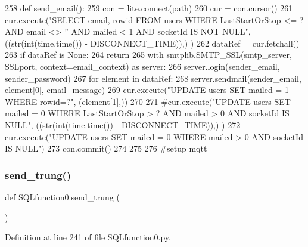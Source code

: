 \begin{DoxyCode}
258 \textcolor{keyword}{def }send_email():
259     con = lite.connect(path)
260     cur = con.cursor()
261     cur.execute(\textcolor{stringliteral}{"SELECT email, rowid FROM users WHERE LastStartOrStop <= ? AND email <> '' AND mailed < 1
       AND socketId IS NOT NULL"}, ((str(int(time.time()) - DISCONNECT\_TIME)),) )
262     dataRef = cur.fetchall()
263     \textcolor{keywordflow}{if} dataRef \textcolor{keywordflow}{is} \textcolor{keywordtype}{None}:
264         \textcolor{keywordflow}{return}
265     with smtplib.SMTP\_SSL(smtp\_server, SSLport, context=email\_context) \textcolor{keyword}{as} server:
266         server.login(sender\_email, sender\_password)
267         \textcolor{keywordflow}{for} element \textcolor{keywordflow}{in} dataRef:            
268             server.sendmail(sender\_email, element[0], email\_message)
269             cur.execute(\textcolor{stringliteral}{"UPDATE users SET mailed = 1 WHERE rowid=?"}, (element[1],))
270             
271     \textcolor{comment}{#cur.execute("UPDATE users SET mailed = 0 WHERE LastStartOrStop > ? AND mailed > 0 AND socketId IS
       NULL", ((str(int(time.time()) - DISCONNECT\_TIME)),) ) }
272     cur.execute(\textcolor{stringliteral}{"UPDATE users SET mailed = 0 WHERE mailed > 0 AND socketId IS NULL"}) 
273     con.commit()
274     
275 
276 \textcolor{comment}{#setup mqtt}
\end{DoxyCode}
\mbox{\label{namespace_s_q_lfunction0_ab417fd6714305987eaee04fc959f0f17}} 
\subsubsection{send\+\_\+trung()}
{\footnotesize\ttfamily def S\+Q\+Lfunction0.\+send\+\_\+trung (\begin{DoxyParamCaption}{ }\end{DoxyParamCaption})}



Definition at line 241 of file S\+Q\+Lfunction0.\+py.


